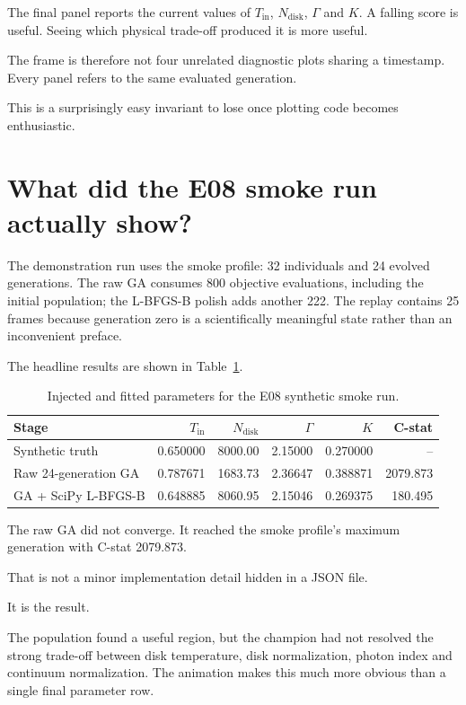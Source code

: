 \documentclass[11pt]{article}
\begin{document}
The final panel reports the current values of $T_{\mathrm{in}}$,
$N_{\mathrm{disk}}$, $\Gamma$ and $K$. A falling score is useful. Seeing which
physical trade-off produced it is more useful.

The frame is therefore not four unrelated diagnostic plots sharing a timestamp.
Every panel refers to the same evaluated generation.

This is a surprisingly easy invariant to lose once plotting code becomes
enthusiastic.

\section{What did the E08 smoke run actually show?}

The demonstration run uses the smoke profile: 32 individuals and 24 evolved
generations. The raw GA consumes 800 objective evaluations, including the
initial population; the L-BFGS-B polish adds another 222. The replay contains
25 frames because generation zero is a scientifically meaningful state rather
than an inconvenient preface.

The headline results are shown in Table~\ref{tab:e08}.

\begin{table}[htbp]
  \centering
  \caption{Injected and fitted parameters for the E08 synthetic smoke run.}
  \label{tab:e08}
  \small
  \begin{tabular}{lrrrrr}
    \toprule
    Stage & $T_{\mathrm{in}}$ & $N_{\mathrm{disk}}$ & $\Gamma$ & $K$ & C-stat \\
    \midrule
    Synthetic truth       & 0.650000 & 8000.00 & 2.15000 & 0.270000 & -- \\
    Raw 24-generation GA  & 0.787671 & 1683.73 & 2.36647 & 0.388871 & 2079.873 \\
    GA + SciPy L-BFGS-B   & 0.648885 & 8060.95 & 2.15046 & 0.269375 & 180.495 \\
    \bottomrule
  \end{tabular}
\end{table}

The raw GA did not converge. It reached the smoke profile's maximum generation
with C-stat 2079.873.

That is not a minor implementation detail hidden in a JSON file.

It is the result.

The population found a useful region, but the champion had not resolved the
strong trade-off between disk temperature, disk normalization, photon index and
continuum normalization. The animation makes this much more obvious than a
single final parameter row.
\end{document}
